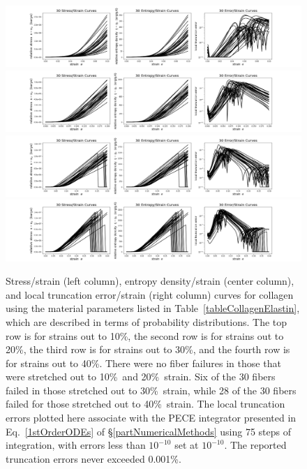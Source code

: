 \begin{figure}
    \mbox{}\hspace{-1.5cm}
    \includegraphics[width=1.2\textwidth]{figures/bioFibers10.jpg}
    \mbox{}\hspace{-1.5cm}
    \includegraphics[width=1.2\textwidth]{figures/bioFibers20.jpg}
    \mbox{}\hspace{-1.5cm}
    \includegraphics[width=1.2\textwidth]{figures/bioFibers30.jpg}
    \mbox{}\hspace{-1.5cm}
    \includegraphics[width=1.2\textwidth]{figures/bioFibers40.jpg}
    \caption{Stress\slash strain (left column), entropy density\slash strain (center column), and local truncation error\slash strain (right column) curves for collagen using the material parameters listed in Table~\ref{tableCollagenElastin}, which are described in terms of probability distributions.  The top row is for strains out to 10\%, the second row is for strains out to 20\%, the third row is for strains out to 30\%, and the fourth row is for strains out to 40\%.  There were no fiber failures in those that were stretched out to 10\%\ and 20\%\ strain.  Six of the 30 fibers failed in those stretched out to 30\%\ strain, while 28 of the 30 fibers failed for those stretched out to 40\%\ strain.  The local truncation errors plotted here associate with the PECE integrator presented in Eq.~\ref{1stOrderODEs} of \S\ref{partNumericalMethods} using 75 steps of integration, with errors less than $10^{-10}$ set at $10^{-10}$.  The reported truncation errors never exceeded 0.001\%.}
    \label{figCollagenFiber}
\end{figure}

